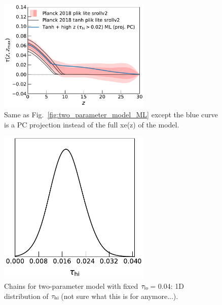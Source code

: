\documentclass[prd,amsmath,amssymb,floatfix,superscriptaddress,nofootinbib]{revtex4-1}
\newcommand{\tauhi}{$\tau_{\rm hi}\,$}
\newcommand{\taulo}{$\tau_{\rm lo}\,$}
\begin{document}
\begin{figure}
\includegraphics[width=0.65\textwidth]{  results/direct_mcmc/pl18_plots_zmax30/plot_pub_tau_gtz_dz_0p1_pl18_pc_zmax30_pliklite_srollv2_0930_and_pl18_tanh_post_pliklite_srollv2_with_added_two_parameter_ML_PC_proj.pdf}
\caption{Same as Fig.~\ref{fig:two_parameter_model_ML} except the blue curve is a PC projection instead of the full xe(z) of the model.
}
\label{fig:}
\end{figure}

\begin{figure}
\includegraphics[width=0.65\textwidth]{   results/direct_mcmc/two_parameter_model/fixed_taulo_chains/plot_1D_tau_hi_pl18_tanh_highz_fixed_taulo_test2_run1.pdf}
\caption{Chains for two-parameter model with fixed \taulo = 0.04: 1D distribution of \tauhi (not sure what this is for anymore...).}
\label{fig:}
\end{figure}
\end{document}
